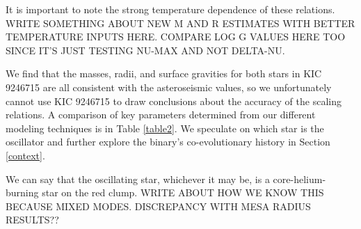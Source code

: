 It is important to note the strong temperature dependence of these relations. WRITE SOMETHING ABOUT NEW M AND R ESTIMATES WITH BETTER TEMPERATURE INPUTS HERE. COMPARE LOG G VALUES HERE TOO SINCE IT'S JUST TESTING NU-MAX AND NOT DELTA-NU.

We find that the masses, radii, and surface gravities for both stars in KIC 9246715 are all consistent with the asteroseismic values, so we unfortunately cannot use KIC 9246715 to draw conclusions about the accuracy of the scaling relations. A comparison of key parameters determined from our different modeling techniques is in Table \ref{table2}. We speculate on which star is the oscillator and further explore the binary's co-evolutionary history in Section \ref{context}.

We can say that the oscillating star, whichever it may be, is a core-helium-burning star on the red clump. WRITE ABOUT HOW WE KNOW THIS BECAUSE MIXED MODES. DISCREPANCY WITH MESA RADIUS RESULTS??

  
  
  
  
  
  
  
  
  
  
  
  
  
  